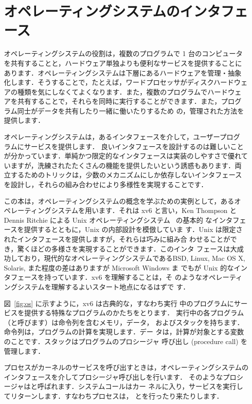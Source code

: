 \chapter{オペレーティングシステムのインタフェース}
\label{CH:UNIX}


オペレーティングシステムの役割は，複数のプログラムで 1 台のコンピュータ
を共有することと，ハードウェア単独よりも便利なサービスを提供することに
あります．オペレーティングシステムは下層にあるハードウェアを管理・抽象
化します．そうすることで，たとえば，ワードプロセッサがディスクハードウェ
アの種類を気にしなくてよくなります．また，複数のプログラムでハードウェ
アを共有することで，それらを同時に実行することができます．また，プログ
ラム同士がデータを共有したり一緒に働いたりするため
の，管理された方法を提供します．

オペレーティングシステムは，あるインタフェースを介して，ユーザープログ
ラムにサービスを提供します．
良いインタフェースを設計するのは難しいこと
が分かっています．単純かつ限定的なインタフェースは実装のしやすさで優れて
いますが，洗練されたたくさんの機能を提供したいという誘惑もあります．両
立するためのトリックは，少数のメカニズムにしか依存しないインタフェース
を設計し，それらの組み合わせにより多様性を実現することです．


この本は，オペレーティングシステムの概念を学ぶための実例として，あるオ
ペレーティングシステムを用います．それは xv6 と言い，Ken
Thompson と Dennis Ritchie による Unix オペレーティングシステム~\cite{unix} の基本的
なインタフェースを提供するとともに，Unix の内部設計を模倣していま
す．Unix は限定されたインタフェースを提供しますが，それらは巧みに組み合
わせることができ，驚くほどの多様さを実現することができます．このインタ
フェースは大成功しており，現代的なオペレーティングシステムであるBSD,
Linux, Mac OS X, Solaris, また程度の差はありますが Microsoft Windows ま
でもが Unix 的なインタフェースを持っています．xv6 を理解することは，そ
のようなオペレーティングシステムを理解するよいスタート地点になるはずで
す．

図~\ref{fig:os} に示すように，xv6 は古典的な，すなわち実行
中のプログラムにサービスを提供する特殊なプログラムのかたちをとります．
実行中の各プログラム（と呼びます）は命令列を含むメモリ，データ，
およびスタックを持ちます．命令列は，プログラムの計算を実現します．デー
タは，計算が対象とする変数のことです．スタックはプログラムのプロシージャ
呼び出し (procedure call) を管理します．


プロセスがカーネルのサービスを呼び出すときは，オペレーティングシステムの
インタフェースを介してプロシージャ呼び出しを行います．
そのようなプロシージャはと呼ばれます．システムコールはカー
ネルに入り，サービスを実行してリターンします．すなわちプロセスは，
とを行ったり来たりします．


